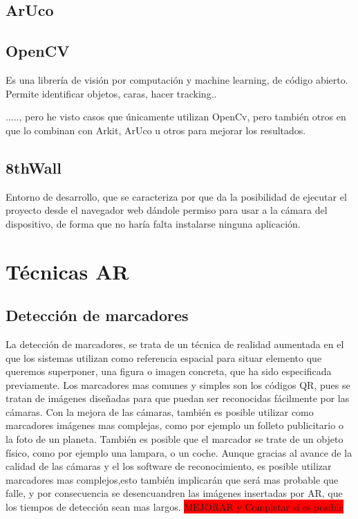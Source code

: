 \subsection{ArUco}


\subsection{OpenCV}
Es una librería de visión por computación y machine learning, de código abierto. Permite identificar objetos, caras, hacer tracking..

....., pero he visto casos que únicamente utilizan OpenCv, pero también otros en que lo combinan con Arkit, ArUco u otros para mejorar los resultados.


\subsection{8thWall}
Entorno de desarrollo, que se caracteriza por que da la posibilidad de ejecutar el proyecto desde el navegador web dándole permiso para usar a la cámara del dispositivo, de forma que no haría falta instalarse ninguna aplicación.




\section{Técnicas AR}
	\subsection{Detección de marcadores}
	La detección de marcadores, se trata de un técnica de realidad aumentada en el que los sistemas utilizan como referencia espacial para situar elemento que queremos superponer, una figura o imagen concreta, que ha sido especificada previamente. Los marcadores mas comunes y simples son los códigos QR, pues se tratan de imágenes diseñadas para que puedan ser reconocidas fácilmente por las cámaras.
	Con la mejora de las cámaras, también es posible utilizar como marcadores imágenes mas complejas, como por ejemplo un folleto publicitario o la foto de un planeta.
	También es posible que el marcador se trate de un objeto físico, como por ejemplo una lampara, o un coche.
	Aunque gracias al avance de la calidad de las cámaras y el los software de reconocimiento, es posible utilizar marcadores mas complejos,esto también implicarán que será mas probable que falle, y por consecuencia se desencuandren las imágenes insertadas por AR, que los tiempos de detección sean mas largos.
	\colorbox{red}{MEJORAR y Completar si es posible}
	
